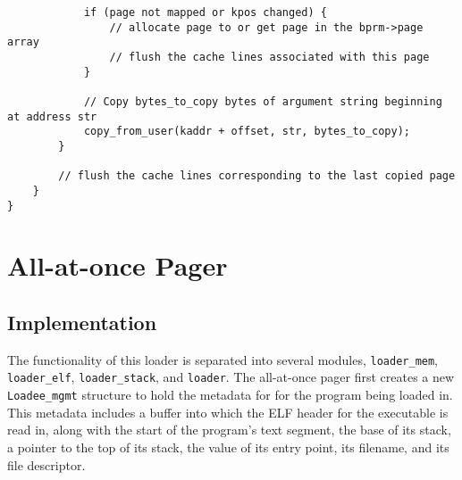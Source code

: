 \documentclass[a4paper]{article}
\begin{document}
{\begin{verbatim}
            if (page not mapped or kpos changed) {
                // allocate page to or get page in the bprm->page array
                // flush the cache lines associated with this page
            }
            
            // Copy bytes_to_copy bytes of argument string beginning at address str
            copy_from_user(kaddr + offset, str, bytes_to_copy);
        }
        
        // flush the cache lines corresponding to the last copied page
    }
}    
\end{verbatim}

%   
%        
%        
%        
%            
%            
%            
%            
%        
%    
%    
%    


\section{All-at-once Pager}
\subsection{Implementation}
The functionality of this loader is separated into several modules, \verb|loader_mem|, \verb|loader_elf|, \verb|loader_stack|, and \verb|loader|. The all-at-once pager first creates a new \verb|Loadee_mgmt| structure to hold the metadata for for the program being loaded in. This metadata includes a buffer into which the ELF header for the executable is read in, along with the start of the program's text segment, the base of its stack, a pointer to the top of its stack, the value of its entry point, its filename, and its file descriptor.

}
\end{document}

